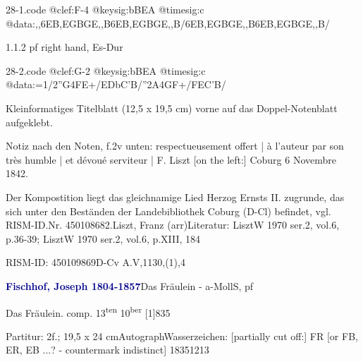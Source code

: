 \documentclass[a4paper, twocolumn, 11pt]{book}
\begin{document}
\begin{filecontents*}{28-1.code}
@clef:F-4
@keysig:bBEA
@timesig:c
@data:,,{6EB,EGBGE,,B}{6EB,EGBGE,,B}/{6EB,EGBGE,,B}{6EB,EGBGE,,B}/
\end{filecontents*}
\newline %
\par 1.1.2  pf right hand, Es-Dur  
\begin{filecontents*}{28-2.code}
@clef:G-2
@keysig:bBEA
@timesig:c
@data:=1/2''G4FE+/EDbC'B/''2A4GF+/FEC'B/
\end{filecontents*}
\newline %
\par Kleinformatiges Titelblatt (12,5 x 19,5 cm) vorne auf das Doppel-Notenblatt aufgeklebt.
\par Notiz nach den Noten, f.2v unten: {\textquotedbl}respectueusement offert | à l'auteur par son très humble | et dévoué serviteur | F. Liszt [on the left:] Coburg 6 Novembre 1842.{\textquotedbl}
\par Der Kompostition liegt das gleichnamige Lied Herzog Ernsts II. zugrunde, das sich unter den Beständen der Landebibliothek Coburg (D-Cl) befindet, vgl. RISM-ID.Nr. 450108682.\newline Liszt, Franz  (arr)\newline Literatur: LisztW 1970  ser.2, vol.6, p.36-39; LisztW 1970  ser.2, vol.6, p.XIII, 184
\par RISM-ID: 450109869\newline D-Cv  A.V,1130,(1),4
\par \vspace{16pt} \textcolor{darkblue}{\textbf{Fischhof, Joseph  1804-1857}}\hfillplus{[29]}\newline Das Fräulein - a-Moll\newline S, pf
\par \begin{itshape} Das Fräulein. comp. 13\textsuperscript{t}\textsuperscript{e}\textsuperscript{n} 10\textsuperscript{b}\textsuperscript{e}\textsuperscript{r} [1]835\end{itshape} 
\par \textcolor{darkblue}{}  Partitur: 2f.; 19,5 x 24 cm\newline Autograph\newline Wasserzeichen: [partially cut off:] FR [or FB, ER, EB ...? - countermark indistinct]  18351213
\end{document}
